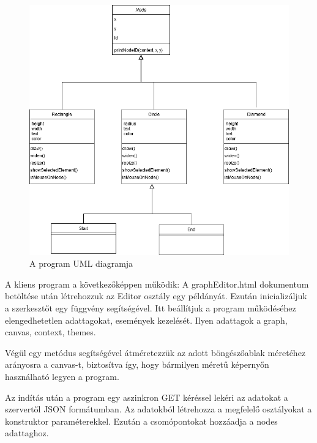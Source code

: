 

\begin{figure}[h]
\centering
\includegraphics[scale=0.5]{images/umldiagram.png}
\caption{A program UML diagramja}
\label{fig:uml}
\end{figure}

A kliens program a következőképpen működik: A graphEditor.html dokumentum betöltése után létrehozzuk az Editor osztály egy példányát. Ezután inicializáljuk a szerkesztőt egy függvény segítségével. Itt beállítjuk a program működéséhez elengedhetetlen adattagokat, események kezelését. Ilyen adattagok a graph, canvas, context, themes.

Végül egy metódus segítségével átméretezzük az adott böngészőablak méretéhez arányosra a canvas-t, biztosítva így, hogy bármilyen méretű képernyőn használható legyen a program.

Az indítás után a program egy aszinkron GET kéréssel lekéri az adatokat a szervertől JSON formátumban. Az adatokból létrehozza a megfelelő osztályokat a konstruktor paraméterekkel. Ezután a csomópontokat hozzáadja a nodes adattaghoz.

